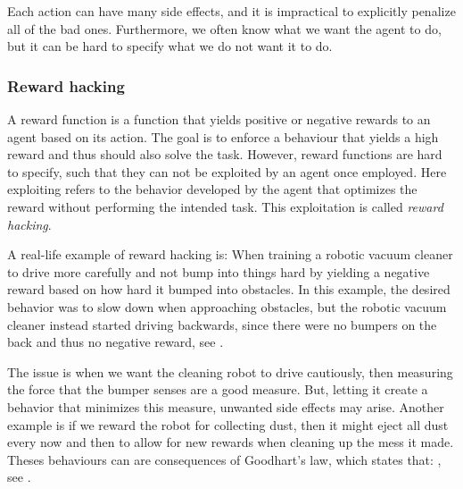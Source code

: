 \documentclass[12pt,A4]{report}
\theoremstyle{definition}
\begin{document}
Each action can have many side effects, and it is impractical to explicitly penalize all of the bad ones. Furthermore, we often know what we want the agent to do, but it can be hard to specify what we do not want it to do. 


\subsubsection{Reward hacking}
A reward function is a function that yields positive or negative rewards to an agent based on its action. The goal is to enforce a behaviour that yields a high reward and thus should also solve the task. However, reward functions are hard to specify, such that they can not be exploited by an agent once employed. Here exploiting refers to the behavior developed by the agent that optimizes the reward without performing the intended task. This exploitation is called \textit{reward hacking}. 

A real-life example of reward hacking is: When training a robotic vacuum cleaner to drive more carefully and not bump into things hard by yielding a negative reward based on how hard it bumped into obstacles. In this example, the desired behavior was to slow down when approaching obstacles, but the robotic vacuum cleaner instead started driving backwards, since there were no bumpers on the back and thus no negative reward, see \citet{Smingleigh}. 

The issue is when we want the cleaning robot to drive cautiously, then measuring the force that the bumper senses are a good measure. But, letting it create a behavior that minimizes this measure, unwanted side effects may arise. Another example is if we reward the robot for collecting dust, then it might eject all dust every now and then to allow for new rewards when cleaning up the mess it made. Theses behaviours can are consequences of Goodhart's law, which states that: , see \citet{wikiGoodhart}. %
\end{document}
